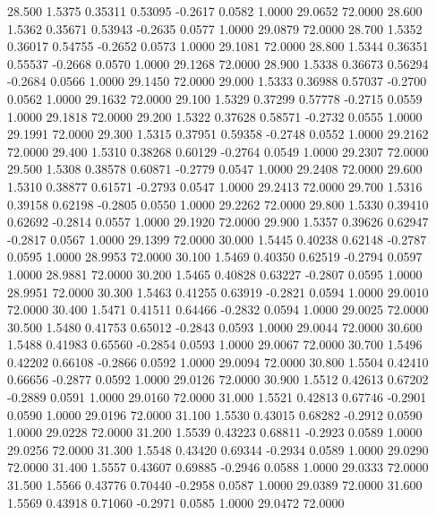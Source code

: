   28.500   1.5375   0.35311   0.53095  -0.2617   0.0582   1.0000  29.0652  72.0000
  28.600   1.5362   0.35671   0.53943  -0.2635   0.0577   1.0000  29.0879  72.0000
  28.700   1.5352   0.36017   0.54755  -0.2652   0.0573   1.0000  29.1081  72.0000
  28.800   1.5344   0.36351   0.55537  -0.2668   0.0570   1.0000  29.1268  72.0000
  28.900   1.5338   0.36673   0.56294  -0.2684   0.0566   1.0000  29.1450  72.0000
  29.000   1.5333   0.36988   0.57037  -0.2700   0.0562   1.0000  29.1632  72.0000
  29.100   1.5329   0.37299   0.57778  -0.2715   0.0559   1.0000  29.1818  72.0000
  29.200   1.5322   0.37628   0.58571  -0.2732   0.0555   1.0000  29.1991  72.0000
  29.300   1.5315   0.37951   0.59358  -0.2748   0.0552   1.0000  29.2162  72.0000
  29.400   1.5310   0.38268   0.60129  -0.2764   0.0549   1.0000  29.2307  72.0000
  29.500   1.5308   0.38578   0.60871  -0.2779   0.0547   1.0000  29.2408  72.0000
  29.600   1.5310   0.38877   0.61571  -0.2793   0.0547   1.0000  29.2413  72.0000
  29.700   1.5316   0.39158   0.62198  -0.2805   0.0550   1.0000  29.2262  72.0000
  29.800   1.5330   0.39410   0.62692  -0.2814   0.0557   1.0000  29.1920  72.0000
  29.900   1.5357   0.39626   0.62947  -0.2817   0.0567   1.0000  29.1399  72.0000
  30.000   1.5445   0.40238   0.62148  -0.2787   0.0595   1.0000  28.9953  72.0000
  30.100   1.5469   0.40350   0.62519  -0.2794   0.0597   1.0000  28.9881  72.0000
  30.200   1.5465   0.40828   0.63227  -0.2807   0.0595   1.0000  28.9951  72.0000
  30.300   1.5463   0.41255   0.63919  -0.2821   0.0594   1.0000  29.0010  72.0000
  30.400   1.5471   0.41511   0.64466  -0.2832   0.0594   1.0000  29.0025  72.0000
  30.500   1.5480   0.41753   0.65012  -0.2843   0.0593   1.0000  29.0044  72.0000
  30.600   1.5488   0.41983   0.65560  -0.2854   0.0593   1.0000  29.0067  72.0000
  30.700   1.5496   0.42202   0.66108  -0.2866   0.0592   1.0000  29.0094  72.0000
  30.800   1.5504   0.42410   0.66656  -0.2877   0.0592   1.0000  29.0126  72.0000
  30.900   1.5512   0.42613   0.67202  -0.2889   0.0591   1.0000  29.0160  72.0000
  31.000   1.5521   0.42813   0.67746  -0.2901   0.0590   1.0000  29.0196  72.0000
  31.100   1.5530   0.43015   0.68282  -0.2912   0.0590   1.0000  29.0228  72.0000
  31.200   1.5539   0.43223   0.68811  -0.2923   0.0589   1.0000  29.0256  72.0000
  31.300   1.5548   0.43420   0.69344  -0.2934   0.0589   1.0000  29.0290  72.0000
  31.400   1.5557   0.43607   0.69885  -0.2946   0.0588   1.0000  29.0333  72.0000
  31.500   1.5566   0.43776   0.70440  -0.2958   0.0587   1.0000  29.0389  72.0000
  31.600   1.5569   0.43918   0.71060  -0.2971   0.0585   1.0000  29.0472  72.0000
